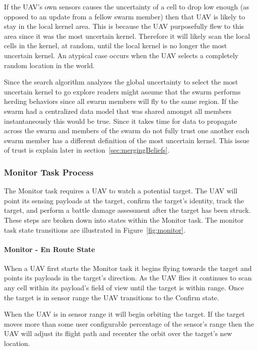 If the UAV's own sensors causes the uncertainty of a cell to drop low enough (as opposed to an update from a fellow swarm member) then that UAV is likely to stay in the local kernel area.  This is because the UAV purposefully flew to this area since it was the most uncertain kernel.  Therefore it will likely scan the local cells in the kernel, at random, until the local kernel is no longer the most uncertain kernel.  An atypical case occurs when the UAV selects a completely random location in the world.

Since the search algorithm analyzes the global uncertainty to select the most uncertain kernel to go explore readers might assume that the swarm performs herding behaviors since all swarm members will fly to the same region.  If the swarm had a centralized data model that was shared amongst all members instantaneously this would be true.  Since it takes time for data to propagate across the swarm and members of the swarm do not fully trust one another each swarm member has a different definition of the most uncertain kernel.  This issue of trust is explain later in section~\ref{sec:mergingBeliefs}.

\subsubsection{Monitor Task Process}
The Monitor task requires a UAV to watch a potential target.  The UAV will point its sensing payloads at the target, confirm the target's identity, track the target, and perform a battle damage assessment after the target has been struck.  These steps are broken down into states within the Monitor task.  The monitor task state transitions are illustrated in Figure~\ref{fig:monitor}.

\paragraph{Monitor - En Route State}
When a UAV first starts the Monitor task it begins flying towards the target and points its payloads in the target's direction.  As the UAV flies it continues to scan any cell within its payload's field of view until the target is within range.  Once the target is in sensor range the UAV transitions to the Confirm state.  

When the UAV is in sensor range it will begin orbiting the target.  If the target moves more than some user configurable percentage of the sensor's range then the UAV will adjust its flight path and recenter the orbit over the target's new location.


